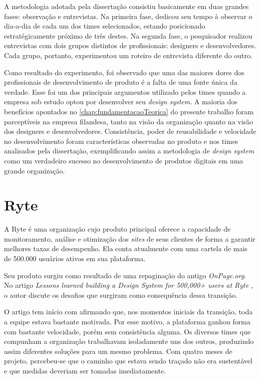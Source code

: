 A metodologia adotada pela dissertação consistiu basicamente em duas grandes fases: observação e entrevistas. Na primeira fase,  dedicou seu tempo à observar o dia-a-dia de cada um dos times selecionados, estando posicionado estratégicamente próximo de três destes. Na segunda fase, o pesquisador realizou entrevistas com dois grupos distintos de profissionais: designers e desenvolvedores. Cada grupo, portanto, experimentou um roteiro de entrevista diferente do outro.

Como resultado do experimento, foi observado que uma das maiores dores dos profissionais de desenvolvimento de produto é a falta de uma fonte única da verdade. Esse foi um dos principais argumentos utilizado pelos times quando a empresa sob estudo optou por desenvolver seu \textit{design system}. A maioria dos benefícios apontados no \autoref{chap:fundamentacaoTeorica} do presente trabalho foram parceptíveis na empresa filandesa, tanto na visão da organização quanto na visão dos designers e desenvolvedores. Consistência, poder de reusabilidade e velocidade no desenvolvimento foram características observadas no produto e nos times analisados pela dissertação, exemplificando assim a metodologia de \textit{design system} como um verdadeiro sucesso no desenvolvimento de produtos digitais em uma grande organização.

\section{Ryte}
\label{sec:ryte}

A Ryte é uma organização cujo produto principal oferece a capacidade de monitoramento, análise e otimização dos \textit{sites} de seus clientes de forma a garantir melhores taxas de desempenho. Ela conta atualmente com uma cartela de mais de 500.000 usuários ativos em sua plataforma.

Seu produto surgiu como resultado de uma repaginação do antigo \textit{OnPage.org}. No artigo \textit{Lessons learned building a Design System for 500,000+ users at Ryte} \cite{ryteDesignSystem}, o autor discute os desafios que surgiram como consequência dessa transição.

O artigo tem início com  afirmando que, nos momentos iniciais da transição, toda a equipe estava bastante motivada. Por esse motivo, a plataforma ganhou forma com bastante velocidade, porém sem consistência alguma. Os diversos times que compunham a organização trabalhavam isoladamente uns dos outros, produzindo assim diferentes soluções para um mesmo problema. Com quatro meses de projeto, percebeu-se que o caminho que estava sendo traçado não era sustentável e que medidas deveriam ser tomadas imediatamente.

